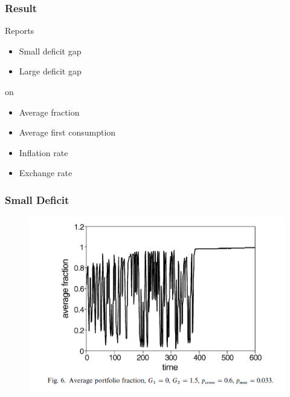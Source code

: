 \begin{frame}
    \frametitle{Result}

    Reports 
    \begin{itemize}
        \item Small deficit gap
        \item Large deficit gap
    \end{itemize}

    on 
    \begin{itemize}
        \item Average fraction
        \item Average first consumption 
        \item Inflation rate
        \item Exchange rate
    \end{itemize}

    

\end{frame}

\begin{frame}
    \frametitle{Small Deficit}

    \begin{figure}
        \includegraphics[width = \textwidth]{fig/small_p.png}
    \end{figure}

\end{frame}


